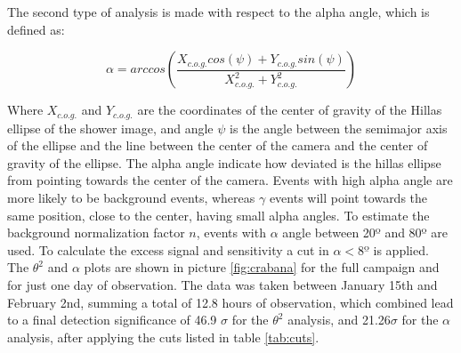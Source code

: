 \documentclass[main.tex]{subfiles}
\begin{document}
The second type of analysis is made with respect to the alpha angle, which is defined as:

\begin{equation}
  \alpha = arc cos\left(\frac{X_{c.o.g.}cos(\psi) + Y_{c.o.g.} sin(\psi)}{X_{c.o.g.}^2 + Y_{c.o.g.}^2}\right)
\end{equation}

Where $X_{c.o.g.}$ and $Y_{c.o.g.}$ are the coordinates of the center of gravity of the Hillas ellipse of the shower image, and angle $\psi$ is the angle between the semimajor axis of the ellipse and the line between the center of the camera and the center of gravity of the ellipse. The alpha angle indicate how deviated is the hillas ellipse from pointing towards the center of the camera. Events with high alpha angle are more likely to be background events, whereas $\gamma$ events will point towards the same position, close to the center, having small alpha angles. To estimate the background normalization factor $n$, events with $\alpha$ angle between 20º and 80º are used. To calculate the excess signal and sensitivity a cut in $\alpha < 8º$ is applied.\\

The $\theta^2$ and $\alpha$ plots are shown in picture \ref{fig:crabana} for the full campaign and for just one day of observation. The data was taken between January 15th and February 2nd, summing a total of 12.8 hours of observation, which combined lead to a final detection significance of 46.9 $\sigma$ for the $\theta^2$ analysis, and 21.26$\sigma$ for the $\alpha$ analysis, after applying the cuts listed in table \ref{tab:cuts}. 
\end{document}
